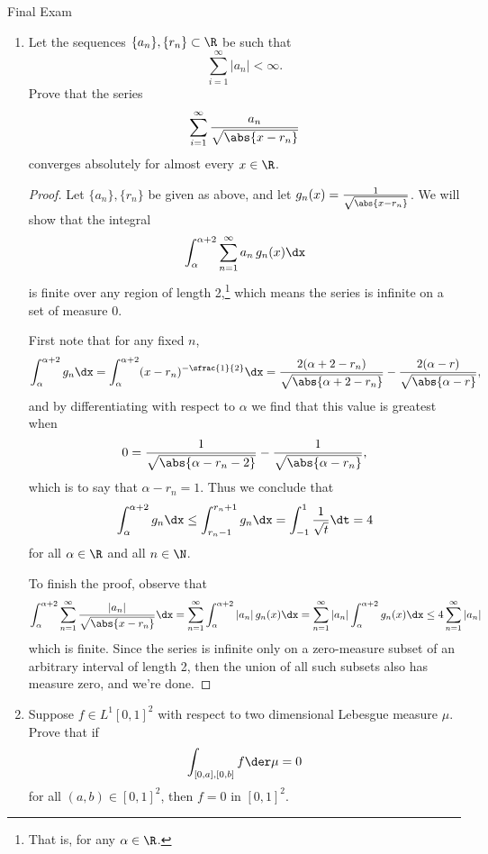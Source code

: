\documentclass[12pt,letterpaper]{article}
\begin{document}
\pagestyle{fancy}
\begin{center}
{\Large Final Exam}%
\end{center}

\begin{enumerate}

\item Let the sequences $\{a_n\}, \{r_n\}\subset \R$ be such that 
$$\sum_{i=1}^\infty |a_n|<\infty.$$
Prove that the series 
$$\sum_{i=1}^\infty \frac{a_n}{\sqrt{\abs{x-r_n}}}$$
converges absolutely for almost every $x\in\R$. 

\begin{proof}
Let $\{a_n\}, \{r_n\}$ be given as above, and let $g_n(x)=\frac{1}{\sqrt{\abs{x-r_n}}}$. We will show that the integral 
$$\int_{\alpha}^{\alpha+2} \sum_{n=1}^\infty {a_n}\,g_n(x)\dx$$
is finite over any region of length 2,\footnote{That is, for any $\alpha\in\R$.} which means the series is infinite on a set of measure 0.

First note that for any fixed $n$, 
$$\int_{\alpha}^{\alpha+2} g_n\dx = \int_{\alpha}^{\alpha+2} (x-r_n)^{-\sfrac{1}{2}} \dx= \frac{2(\alpha+2-r_n)}{\sqrt{\abs{\alpha+2-r_n}}} - \frac{2(\alpha-r)}{\sqrt{\abs{\alpha-r}}},$$
and by differentiating with respect to $\alpha$ we find that this value is greatest when 
$$0=\frac{1}{\sqrt{\abs{\alpha-r_n-2}}} - \frac{1}{\sqrt{\abs{\alpha-r_n}}},$$
which is to say that $\alpha-r_n=1$. Thus we conclude that 
$$\int_{\alpha}^{\alpha+2} g_n\dx\leq \int_{r_n-1}^{r_n+1} g_n\dx=\int_{-1}^1\frac{1}{\sqrt{t}}\dt =4 $$ for all $\alpha\in\R$ and all $ n\in\N$. 

To finish the proof, observe that 
$$\int_{\alpha}^{\alpha+2} \sum_{n=1}^\infty \frac{|a_n|}{\sqrt{\abs{x-r_n}}}\dx 
= \sum_{n=1}^\infty \int_{\alpha}^{\alpha+2} {|a_n|}\,g_n(x)\dx
= \sum_{n=1}^\infty {|a_n|} \int_{\alpha}^{\alpha+2}  g_n(x)\dx
\leq 4\sum_{n=1}^\infty {|a_n|}
$$
which is finite. Since the series is infinite only on a zero-measure subset of an arbitrary interval of length 2, then the union of all such subsets also has measure zero, and we're done. 
\end{proof}

\pagebreak
\item Suppose $f\in L^1[0,1]^2$ with respect to two dimensional Lebesgue measure $\mu$. Prove that if 
$$\int_{[0,a],[0,b]} f \der\mu = 0$$
for all $(a,b)\in [0,1]^2$, then $f=0$ \muae{} in $[0,1]^2$. 


\end{enumerate}
\end{document}
